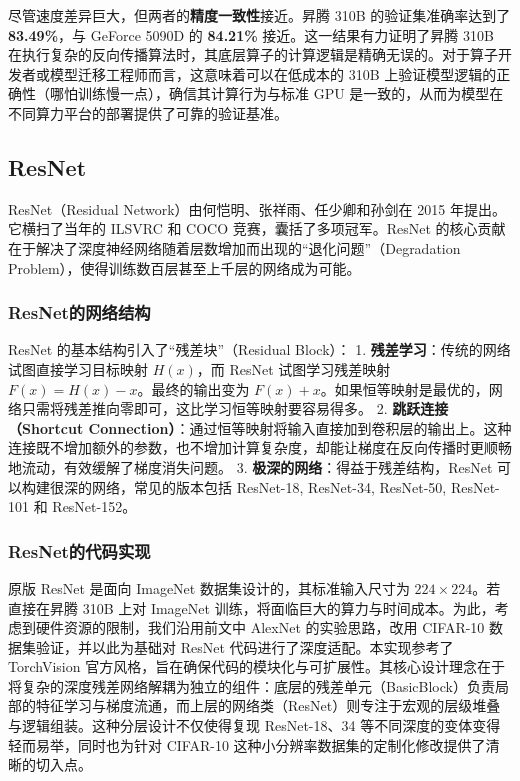 尽管速度差异巨大，但两者的\textbf{精度一致性}接近。昇腾 310B
的验证集准确率达到了 \textbf{83.49\%}，与 GeForce 5090D 的
\textbf{84.21\%} 接近。这一结果有力证明了昇腾 310B
在执行复杂的反向传播算法时，其底层算子的计算逻辑是精确无误的。对于算子开发者或模型迁移工程师而言，这意味着可以在低成本的
310B 上验证模型逻辑的正确性（哪怕训练慢一点），确信其计算行为与标准 GPU
是一致的，从而为模型在不同算力平台的部署提供了可靠的验证基准。

\subsection{ResNet}\label{src-book-chapter3-h28}

ResNet（Residual Network）由何恺明、张祥雨、任少卿和孙剑在 2015
年提出。它横扫了当年的 ILSVRC 和 COCO 竞赛，囊括了多项冠军。ResNet
的核心贡献在于解决了深度神经网络随着层数增加而出现的``退化问题''（Degradation
Problem），使得训练数百层甚至上千层的网络成为可能。

\subsubsection{ResNet的网络结构}\label{src-book-chapter3-h29}

ResNet 的基本结构引入了``残差块''（Residual Block）： 1.
\textbf{残差学习}：传统的网络试图直接学习目标映射 \(H(x)\)，而 ResNet
试图学习残差映射 \(F(x) = H(x) - x\)。最终的输出变为
\(F(x) + x\)。如果恒等映射是最优的，网络只需将残差推向零即可，这比学习恒等映射要容易得多。
2. \textbf{跳跃连接（Shortcut
Connection）}：通过恒等映射将输入直接加到卷积层的输出上。这种连接既不增加额外的参数，也不增加计算复杂度，却能让梯度在反向传播时更顺畅地流动，有效缓解了梯度消失问题。
3. \textbf{极深的网络}：得益于残差结构，ResNet
可以构建很深的网络，常见的版本包括 ResNet-18, ResNet-34, ResNet-50,
ResNet-101 和 ResNet-152。

\subsubsection{ResNet的代码实现}\label{src-book-chapter3-h30}

原版 ResNet 是面向 ImageNet 数据集设计的，其标准输入尺寸为
\(224 \times 224\)。若直接在昇腾 310B 上对 ImageNet
训练，将面临巨大的算力与时间成本。为此，考虑到硬件资源的限制，我们沿用前文中
AlexNet 的实验思路，改用 CIFAR-10 数据集验证，并以此为基础对 ResNet
代码进行了深度适配。本实现参考了 TorchVision
官方风格，旨在确保代码的模块化与可扩展性。其核心设计理念在于将复杂的深度残差网络解耦为独立的组件：底层的残差单元（BasicBlock）负责局部的特征学习与梯度流通，而上层的网络类（ResNet）则专注于宏观的层级堆叠与逻辑组装。这种分层设计不仅使得复现
ResNet-18、34 等不同深度的变体变得轻而易举，同时也为针对 CIFAR-10
这种小分辨率数据集的定制化修改提供了清晰的切入点。

